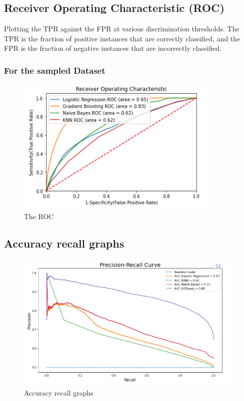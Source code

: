 \newpage
\subsection{Receiver Operating Characteristic (ROC)}
Plotting the TPR against the FPR at various discrimination thresholds. 
The TPR is the fraction of positive instances that are correctly classified, and the FPR is the fraction of 
negative instances that are incorrectly classified.

\subsubsection{For the sampled Dataset}

\begin{figure}[h]
    \centering
    \includegraphics[width=0.7\linewidth]{image21}
    \caption{The ROC}
    \label{fig:The ROC}
\end{figure}

\subsection{Accuracy recall graphs}

\begin{figure}[h]
    \centering
    \includegraphics[width=0.7\linewidth]{image22}
    \caption{Accuracy recall graphs}
    \label{fig:Accuracy recall graphs}
\end{figure}

